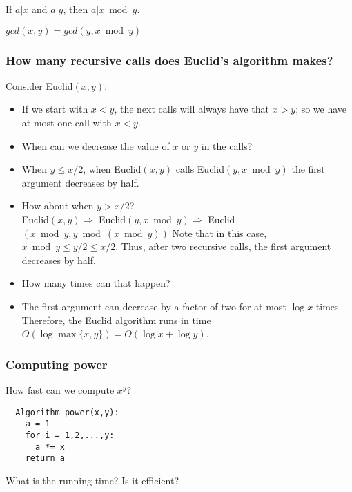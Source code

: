 \begin{frame}
  \begin{lemma}
    If $a|x$ and $a|y$, then $a|x \bmod y$.
  \end{lemma}
  \vspace{0.2in}
  \pause
  \begin{lemma}
    $gcd(x,y)=gcd(y, x\bmod y)$
  \end{lemma}
  \vspace{1.5in}
\end{frame}

\begin{frame}
  \frametitle{How many recursive calls does Euclid's algorithm makes?}
  \pause

  Consider Euclid$(x,y)$:
  \begin{itemize}
  \item If we start with $x<y$, the next calls will always have that
    $x>y$; so we have at most one call with $x<y$.
    \pause
  \item When can we decrease the value of $x$ or $y$ in the calls?
    \pause
  \item When $y\leq x/2$, when Euclid$(x,y)$ calls Euclid$(y,x\bmod y)$ the
    first argument decreases by half.
    \pause
  \item How about when $y> x/2$? \pause \\
    {\small
    Euclid$(x,y) \Rightarrow$ \pause
    Euclid$(y, x\bmod y) \Rightarrow$ \pause
    Euclid$(x\bmod y, y\bmod (x\bmod y))$} \pause
    Note that in this case, $x\bmod y\leq y/2\leq x/2$. \pause
    Thus, after two recursive calls, the first argument decreases by half.
  \item How many times can that happen?
  \item The first argument can decrease by a factor of two for at most
    $\log x$ times.  Therefore, the Euclid algorithm runs in time
    $O(\log\max\{x,y\})=O(\log x + \log y)$. 
  \end{itemize}
\end{frame}

\begin{frame}[fragile]
  \frametitle{Computing power}

  How fast can we compute $x^y$?

  \pause
  \begin{tcolorbox}
  {\small
\begin{verbatim}
  Algorithm power(x,y):
    a = 1
    for i = 1,2,...,y:
      a *= x
    return a
\end{verbatim}
  }
  \end{tcolorbox}
  
  \pause What is the running time? \pause Is it efficient?
\end{frame}

